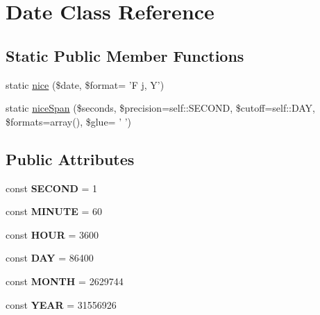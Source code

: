 \hypertarget{classDate}{
\section{Date Class Reference}
\label{classDate}
}
\subsection*{Static Public Member Functions}
\begin{DoxyCompactItemize}
\item 
static \hyperlink{classDate_a9411511f91e820a9ffdedcbb4142fe32}{nice} (\$date, \$format= 'F j, Y')
\item 
static \hyperlink{classDate_a8a7c5375c96e43188434646202e71b07}{niceSpan} (\$seconds, \$precision=self::SECOND, \$cutoff=self::DAY, \$formats=array(), \$glue= ' ')
\end{DoxyCompactItemize}
\subsection*{Public Attributes}
\begin{DoxyCompactItemize}
\item 
\hypertarget{classDate_a8dfc17740f9b7a2f64a591a96f8a42fb}{
const {\bfseries SECOND} = 1}
\label{classDate_a8dfc17740f9b7a2f64a591a96f8a42fb}

\item 
\hypertarget{classDate_a7310a231d6b0235fc79589c878ca52c5}{
const {\bfseries MINUTE} = 60}
\label{classDate_a7310a231d6b0235fc79589c878ca52c5}

\item 
\hypertarget{classDate_aebd8725238ea4fab8803a489d083c66d}{
const {\bfseries HOUR} = 3600}
\label{classDate_aebd8725238ea4fab8803a489d083c66d}

\item 
\hypertarget{classDate_a1c78484633ffc685a1677c6b1185d5be}{
const {\bfseries DAY} = 86400}
\label{classDate_a1c78484633ffc685a1677c6b1185d5be}

\item 
\hypertarget{classDate_a834af4f51ff32608945ff6b571b57d06}{
const {\bfseries MONTH} = 2629744}
\label{classDate_a834af4f51ff32608945ff6b571b57d06}

\item 
\hypertarget{classDate_a88ff2c34643450905f490de48c0e4737}{
const {\bfseries YEAR} = 31556926}
\label{classDate_a88ff2c34643450905f490de48c0e4737}

\end{DoxyCompactItemize}


